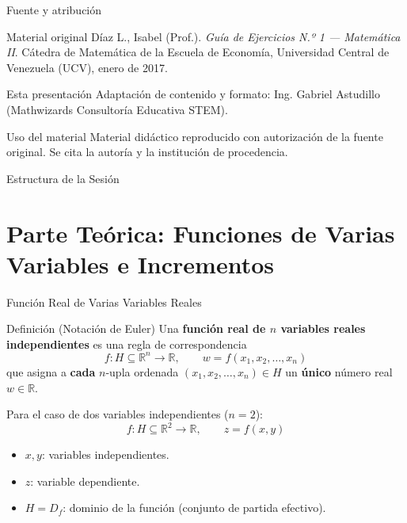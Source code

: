 \documentclass[aspectratio=169,10pt]{beamer}
\begin{document}
\begin{frame}[plain]
  \titlepage
\end{frame}

\begin{frame}{Fuente y atribución}
  \small
  \begin{block}{Material original}
    Díaz L., Isabel (Prof.). \emph{Guía de Ejercicios N.º 1 — Matemática II}.
    Cátedra de Matemática de la Escuela de Economía,
    Universidad Central de Venezuela (UCV), enero de 2017.
  \end{block}
  \begin{block}{Esta presentación}
    Adaptación de contenido y formato: Ing. Gabriel Astudillo
    (Mathwizards Consultoría Educativa STEM).
  \end{block}
  \begin{block}{Uso del material}
    Material didáctico reproducido con autorización de la fuente original.
    Se cita la autoría y la institución de procedencia.
  \end{block}
\end{frame}

\begin{frame}{Estructura de la Sesión}
  \tableofcontents
\end{frame}

\section{Parte Teórica: Funciones de Varias Variables e Incrementos}

\begin{frame}{Función Real de Varias Variables Reales}
  \begin{block}{Definición (Notación de Euler)}
    Una \textbf{función real de $n$ variables reales independientes} es una regla de correspondencia
    \[
      f : H \subseteq \mathbb{R}^n \longrightarrow \mathbb{R}, \qquad w = f(x_1, x_2, \dots, x_n)
    \]
    que asigna a \textbf{cada} $n$-upla ordenada $(x_1, x_2, \dots, x_n) \in H$ un \textbf{único} número real $w \in \mathbb{R}$.
  \end{block}

  \vspace{0.3cm}
  Para el caso de dos variables independientes ($n=2$):
  \[
    f : H \subseteq \mathbb{R}^2 \longrightarrow \mathbb{R}, \qquad z = f(x, y)
  \]
  \begin{itemize}
    \item $x, y$: variables independientes.
    \item $z$: variable dependiente.
    \item $H = D_f$: dominio de la función (conjunto de partida efectivo).
  \end{itemize}
\end{frame}
\end{document}
